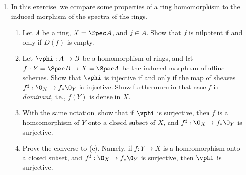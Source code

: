 \documentclass[12pt]{amsart}
\begin{document}

\begin{enumerate}
	\item[2.18.] {
      In this exercise, we compare some properties of a ring homomorphism to the induced morphism of the spectra of the rings.
      \begin{enumerate}
        \item Let $A$ be a ring, $X=\Spec A$, and $f\in A$.
          Show that $f$ is nilpotent if and only if $D(f)$ is empty.
        \item Let $\vphi:A\to B$ be a homomorphism of rings, and let $f:Y=\Spec B\to X=\Spec A$ be the induced morphism of affine schemes.
          Show that $\vphi$ is injective if and only if the map of sheaves $f^\sharp:\O_X\to f_*\O_Y$ is injective.
          Show furthermore in that case $f$ is \emph{dominant}, i.e., $f(Y)$ is dense in $X$.
        \item With the same notation, show that if $\vphi$ is surjective, then $f$ is a homeomorphism of $Y$ onto a closed subset of $X$, and $f^\sharp:\O_X\to f_*\O_Y$ is surjective.
        \item Prove the converse to (c).
          Namely, if $f:Y\to X$ is a homeomorphism onto a closed subset, and $f^\sharp:\O_X\to f_*\O_Y$ is surjective, then $\vphi$ is surjective.
      \end{enumerate}
    }
\end{enumerate}
\end{document}
